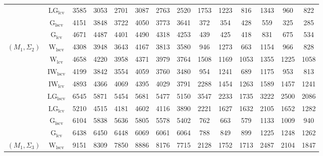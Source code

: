 \begin{table}[!ht]
{\begin{tabular}{@{}cc|ccc|ccc|ccc|ccc@{}}
 & $\mathrm{LG}_{\mathrm{lcv}}$ & 3585 & 3053 & 2701 & 3087 & 2763 & 2520 & 1753 & 1223 & 816 & 1343 & 960 & 822 \\ 
 & $\mathrm{G}_{\mathrm{lscv}}$ & 4151 & 3848 & 3722 & 4050 & 3773 & 3641 & \cellcolor{black!30}372 & \cellcolor{black!30}354 & \cellcolor{black!10}428 & \cellcolor{black!30}559 & \cellcolor{black!30}325 & \cellcolor{black!30}285 \\ 
 & $\mathrm{G}_{\mathrm{lcv}}$ & 4671 & 4487 & 4401 & 4490 & 4318 & 4253 & \cellcolor{black!10}439 & \cellcolor{black!10}425 & \cellcolor{black!30}418 & 831 & 675 & 534 \\ 
\midrule
$(M_1,\Sigma_2)$ & $\mathrm{W}_{\mathrm{lscv}}$ & \cellcolor{black!10}4308 & \cellcolor{black!10}3948 & \cellcolor{black!10}3643 & \cellcolor{black!10}4167 & \cellcolor{black!10}3813 & \cellcolor{black!10}3580 & 946 & 1273 & \cellcolor{black!10}663 & \cellcolor{black!10}1154 & \cellcolor{black!10}966 & \cellcolor{black!10}828 \\ 
 & $\mathrm{W}_{\mathrm{lcv}}$ & 4658 & 4220 & 3958 & 4371 & 3979 & 3764 & 1508 & 1169 & 1053 & 1355 & 1225 & 1058 \\ 
 & $\mathrm{IW}_{\mathrm{lscv}}$ & \cellcolor{black!30}4199 & \cellcolor{black!30}3842 & \cellcolor{black!30}3554 & \cellcolor{black!30}4059 & \cellcolor{black!30}3760 & \cellcolor{black!30}3480 & 954 & 1241 & 689 & 1175 & \cellcolor{black!30}953 & \cellcolor{black!30}813 \\ 
 & $\mathrm{IW}_{\mathrm{lcv}}$ & 4893 & 4366 & 4069 & 4395 & 4029 & 3791 & 2288 & 1454 & 1263 & 1589 & 1457 & 1241 \\ 
 & $\mathrm{LG}_{\mathrm{lscv}}$ & 6545 & 5871 & 5454 & 5681 & 5477 & 5150 & 3547 & 2233 & 1735 & 3222 & 2500 & 2086 \\ 
 & $\mathrm{LG}_{\mathrm{lcv}}$ & 5210 & 4515 & 4181 & 4602 & 4116 & 3890 & 2221 & 1627 & 1632 & 2105 & 1652 & 1282 \\ 
 & $\mathrm{G}_{\mathrm{lscv}}$ & 6104 & 5838 & 5636 & 5805 & 5578 & 5402 & \cellcolor{black!30}762 & \cellcolor{black!30}663 & \cellcolor{black!30}579 & \cellcolor{black!30}1133 & 1009 & 940 \\ 
 & $\mathrm{G}_{\mathrm{lcv}}$ & 6438 & 6450 & 6448 & 6069 & 6061 & 6064 & \cellcolor{black!10}788 & \cellcolor{black!10}849 & 899 & 1225 & 1248 & 1262 \\ 
\midrule
$(M_1,\Sigma_3)$ & $\mathrm{W}_{\mathrm{lscv}}$ & \cellcolor{black!10}9151 & \cellcolor{black!10}8309 & \cellcolor{black!10}7850 & 8886 & 8176 & 7715 & \cellcolor{black!10}2128 & \cellcolor{black!10}1752 & 1713 & \cellcolor{black!10}2487 & 2104 & 1847 \\ 

\end{tabular}}
\end{table}
